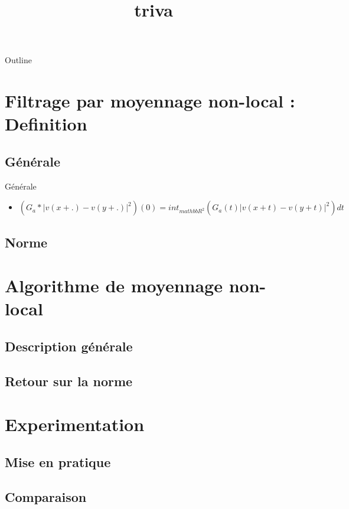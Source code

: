 \documentclass{beamer}
\title{ triva }
\begin{document}
 

 
 \begin{frame} 
   \titlepage 
 \end{frame} 
 
 \begin{frame}{Outline} 
 \tableofcontents 
 \end{frame} 

\section{ Filtrage par moyennage non-local : Definition } 
\subsection{Générale} 

  \begin{frame}{Générale}{} 

     \begin{itemize} 
      \item { 
         $$ (G_a * |v(x+.)-v(y + .)|^2)(0) = int_{mathbb{R}^2} (G_a(t) |v(x+t)-v(y+t)|^2) dt $$ 
      } 
   \end{itemize} 
 \end{frame}

\subsection{Norme} 

\section{ Algorithme de moyennage non-local } 
\subsection{Description générale} 

\subsection{Retour sur la norme} 

\section{ Experimentation } 
\subsection{Mise en pratique} 

\subsection{Comparaison} 
\end{document}
